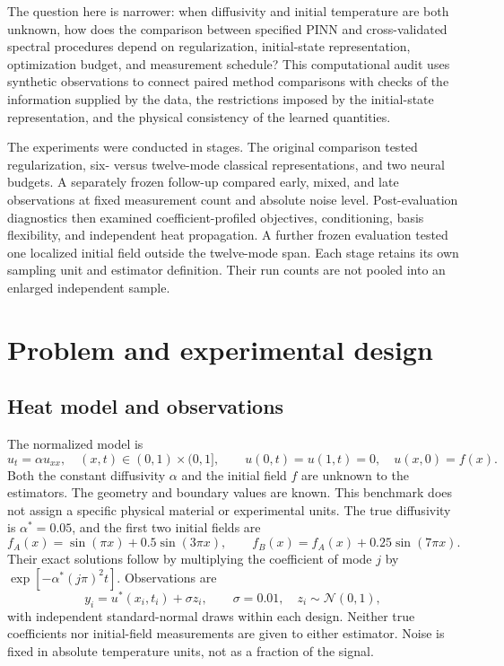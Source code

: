 \documentclass[11pt,a4paper]{article}
\begin{document}
The question here is narrower: when diffusivity and initial temperature are both unknown, how does the comparison between specified PINN and cross-validated spectral procedures depend on regularization, initial-state representation, optimization budget, and measurement schedule? This computational audit uses synthetic observations to connect paired method comparisons with checks of the information supplied by the data, the restrictions imposed by the initial-state representation, and the physical consistency of the learned quantities.

The experiments were conducted in stages. The original comparison tested regularization, six- versus twelve-mode classical representations, and two neural budgets. A separately frozen follow-up compared early, mixed, and late observations at fixed measurement count and absolute noise level. Post-evaluation diagnostics then examined coefficient-profiled objectives, conditioning, basis flexibility, and independent heat propagation. A further frozen evaluation tested one localized initial field outside the twelve-mode span. Each stage retains its own sampling unit and estimator definition. Their run counts are not pooled into an enlarged independent sample.

\section{Problem and experimental design}
\subsection{Heat model and observations}
The normalized model is
\begin{equation}
 u_t=\alpha u_{xx},\quad (x,t)\in(0,1)\times(0,1],\qquad
 u(0,t)=u(1,t)=0,\quad u(x,0)=f(x).
\label{eq:heat}
\end{equation}
Both the constant diffusivity $\alpha$ and the initial field $f$ are unknown to the estimators. The geometry and boundary values are known. This benchmark does not assign a specific physical material or experimental units. The true diffusivity is $\alpha^*=0.05$, and the first two initial fields are
\begin{equation}
 f_A(x)=\sin(\pi x)+0.5\sin(3\pi x),\qquad
 f_B(x)=f_A(x)+0.25\sin(7\pi x).
\end{equation}
Their exact solutions follow by multiplying the coefficient of mode $j$ by $\exp[-\alpha^*(j\pi)^2t]$. Observations are
\begin{equation}
 y_i=u^*(x_i,t_i)+\sigma z_i,\qquad \sigma=0.01,\quad z_i\sim\mathcal N(0,1),
\end{equation}
with independent standard-normal draws within each design. Neither true coefficients nor initial-field measurements are given to either estimator. Noise is fixed in absolute temperature units, not as a fraction of the signal.
\end{document}

